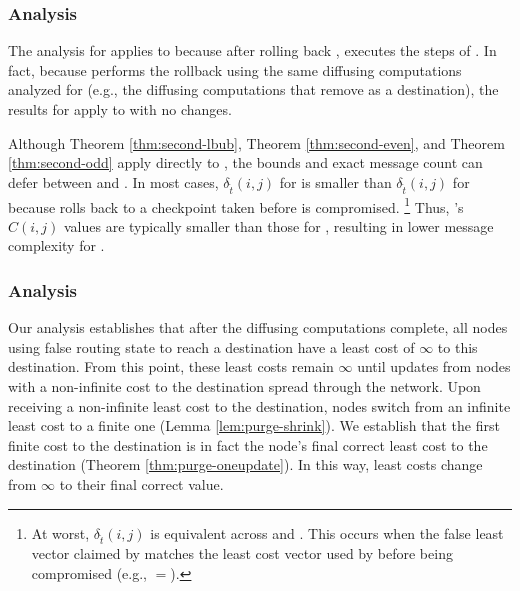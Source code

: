 {{\subsubsection{\cpr Analysis}
\label{subsubsec:cpr-analysis}

The analysis for \second applies to \cpr because after rolling back \cprs, executes the steps of \seconds.  In fact, because \cpr performs the rollback 
using the same diffusing computations analyzed for \second (e.g., the diffusing
computations that remove \bad as a destination), the results for \second apply to \cpr with no changes. %

Although Theorem \ref{thm:second-lbub}, Theorem \ref{thm:second-even}, and Theorem \ref{thm:second-odd} apply directly to \cprs, the bounds and exact message count can defer 
between \second and \cprs. 
In most cases,  $\delta_{\hat{t}}(i,j)$ for \second is smaller than $\delta_{\hat{t}}(i,j)$ for \cpr because \cpr rolls back to a checkpoint taken before \bad is compromised. 
{\footnote {\small At worst, $\delta_{\hat{t}}(i,j)$ is equivalent across \second and \cprs.  This occurs when the false least vector claimed by \bad matches the least cost
vector used by \bad before being compromised (e.g., \badvectors$=$\oldvectors). }}
Thus, \cprs's $C(i,j)$ values are typically smaller than those for \seconds, resulting in lower message complexity for \cprs.

\subsubsection{\purge Analysis}
\label{subsubsec:purge-analysis}

Our \purge analysis establishes that after the diffusing computations complete, all nodes using false routing state to reach a destination
have a least cost of $\infty$ to this destination.  %
From this point, these least costs remain $\infty$ until updates from nodes with a non-infinite cost to the destination spread through the network.  Upon receiving a non-infinite
least cost to the destination, nodes switch from an infinite least cost to a finite one (Lemma \ref{lem:purge-shrink}).  We establish that the first finite cost to the destination is in fact the node's final correct
least cost to the destination (Theorem \ref{thm:purge-oneupdate}). In this way, least costs change from $\infty$ to their final correct value.

}}
